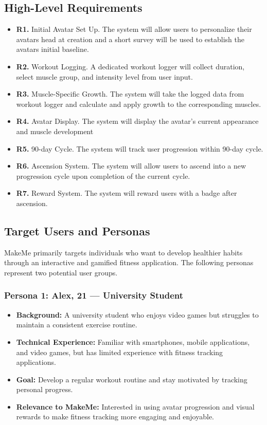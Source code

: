 \documentclass[11pt]{article}
\begin{document}
\subsection{High-Level Requirements}
\begin{itemize}
    \item \textbf{R1.} Initial Avatar Set Up. The system will allow users to personalize their avatars head
        at creation and a short survey will be used to establish the avatars initial baseline.
    \item \textbf{R2.} Workout Logging. A dedicated workout logger will collect
        duration, select muscle group, and intensity level from user input.
    \item \textbf{R3.} Muscle-Specific Growth. The system will take the logged data from workout logger
        and calculate and apply growth to the corresponding muscles.
    \item \textbf{R4.} Avatar Display. The system will display the avatar's current appearance and muscle development
    \item \textbf{R5.} 90-day Cycle. The system will track user progression within 90-day cycle.
    \item \textbf{R6.} Ascension System. The system will allow users to ascend into a new progression cycle
        upon completion of the current cycle.
    \item \textbf{R7.} Reward System. The system will reward users with a badge after ascension.
\end{itemize}
\subsection{Target Users and Personas}
MakeMe primarily targets individuals who want to develop healthier habits through an interactive and gamified fitness application. The following personas represent two potential user groups.

\subsubsection*{Persona 1: Alex, 21 --- University Student}

\begin{itemize}
    \item \textbf{Background:}
    A university student who enjoys video games but struggles to maintain a consistent exercise routine.
    \item \textbf{Technical Experience:}
    Familiar with smartphones, mobile applications, and video games, but has limited experience with fitness tracking applications.
    \item \textbf{Goal:}
    Develop a regular workout routine and stay motivated by tracking personal progress.
    \item \textbf{Relevance to MakeMe:}
    Interested in using avatar progression and visual rewards to make fitness tracking more engaging and enjoyable.
\end{itemize}
\end{document}

